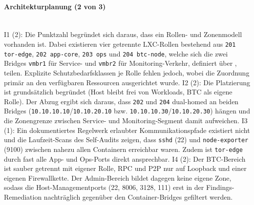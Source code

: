 \paragraph{Architekturplanung (2 von 3)} \mbox{}\\
I1 (2): Die Punktzahl begründet sich daraus, dass ein Rollen- und Zonenmodell vorhanden ist.
Dabei existieren vier getrennte \ac{LXC}-Rollen bestehend aus \texttt{201 tor-edge}, \texttt{202 app-core}, \texttt{203 ops} und \texttt{204 btc-node}, welche sich die zwei Bridges \texttt{vmbr1} für Service- und \texttt{vmbr2} für Monitoring-Verkehr, definiert über , teilen. 
Explizite
Schutzbedarfsklassen je Rolle fehlen jedoch, wobei die Zuordnung primär an den
verfügbaren Ressourcen ausgerichtet wurde.\cite{runbookA}
I2 (2): Die Platzierung ist grundsätzlich begründet (Host bleibt frei von Workloads, \ac{BTC} als eigene Rolle). 
Der Abzug ergibt sich daraus, dass \texttt{202} und \texttt{204} dual-homed an beiden Bridges 
(\texttt{10.10.10.10}/\texttt{10.10.20.10} bzw.
\texttt{10.10.10.30}/\texttt{10.10.20.30}) hängen und die Zonengrenze zwischen Service- und Monitoring-Segment damit aufweichen.\cite{runbookA}
I3 (1): Ein dokumentiertes Regelwerk erlaubter Kommunikationspfade existiert nicht und die Laufzeit-Scans des Self-Audits zeigen, dass \texttt{sshd} (22) und \texttt{node-exporter} (9100) zwischen nahezu allen Containern erreichbar waren. Zudem ist \texttt{tor-edge} durch fast alle App- und Ops-Ports direkt ansprechbar.\cite{selfauditA}
I4 (2): Der \ac{BTC}-Bereich ist sauber getrennt mit eigener Rolle, \ac{RPC} und \ac{P2P} nur
auf Loopback und einer eigenen Firewallkette. 
Der Admin-Bereich bildet dagegen keine eigene Zone, sodass die Host-Managementports (22, 8006, 3128, 111) erst in der Findings-Remediation nachträglich gegenüber den Container-Bridges gefiltert werden.\cite{runbookA,selfauditA}

